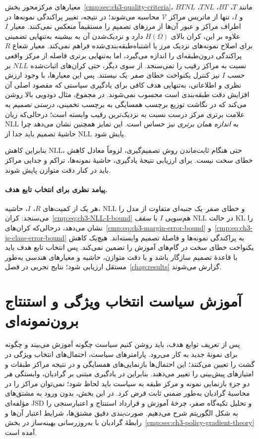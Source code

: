 معیارهای مرکز‌محور بخش~\ref{cmp:sec:ch3-quality-criteria}، مانند $T$، $BT$، $TNL$، $BTNL$ و $I$، تنها از ماتریس مراکز $\mathcal V$ محاسبه می‌شوند؛ در نتیجه، تغییر پراکندگی نمونه‌ها در اطراف مراکز و عبور آن‌ها از مرزهای تصمیم را مستقیماً منعکس نمی‌کنند. معیار $I$ علاوه بر این، کران بالای $H(\Omega)$ دارد و نزدیک‌شدن آن به بیشینه به‌تنهایی تضمینی برای اصلاح نمونه‌های نزدیک مرز یا اشتباه‌طبقه‌بندی‌شده فراهم نمی‌کند. معیار شعاع $R$ پراکندگی درون‌طبقه‌ای را اندازه می‌گیرد، اما به‌تنهایی برتری فاصله از مرکز واقعی نسبت به مراکز رقیب را نمی‌سنجد. از سوی دیگر، حتی کران‌های اثبات‌شده $NLL$ بر حسب $I$ نیز کنترل یکنواخت خطای صفر--یک نیستند. پس این معیارها، با وجود ارزش نظری و اطلاعاتی،
به‌تنهایی هدف کافی برای یادگیری سیاستی
که مقصود اصلی آن افزایش دقت طبقه‌بندی است
محسوب نمی‌شوند.
در مجموع، مثال دودویی بالا روشن می‌کند
که در نگاشت توزیع برچسب همسایگی
به برچسب تخمینی، \emph{درستی تصمیم}
به علامت برتری مرکز درست نسبت به
نزدیک‌ترین رقیب وابسته است؛
درحالی‌که زیان NLL به \emph{اندازه
همان برتری} نیز حساس است.
این تمایز همچنین نشان می‌دهد چرا
حاشیهٔ تصمیم باید جدا از NLL پایش شود.

بنابراین کاهش NLL، حتی هنگام ثابت‌ماندن
روش تصمیم‌گیری، لزوماً معادل کاهش خطای سخت
نیست. برای ارزیابی نتیجهٔ یادگیری،
حاشیهٔ نمونه‌ها، تراکم و جدایی مراکز
باید در کنار دقت متوازن پایش شوند.


\paragraph{پیامد نظری برای انتخاب تابع هدف.}
هر یک از کمیت‌های $R$، $I$، حاشیه، NLL و
خطای صفر--یک جنبه‌ای متفاوت از مدل را می‌سنجد:
کران~\eqref{cmp:eq:ch3-NLL-I-bound} هم‌سویی
$I$ با \emph{سقف} NLL در حالت KL را نشان می‌دهد،
درحالی‌که کران‌های~\eqref{cmp:eq:ch3-margin-error-bound}
و~\eqref{cmp:eq:ch3-js-class-error-bound}
به پراکندگی نمونه‌ها و فاصلهٔ تصمیم وابسته‌اند.
هیچ‌یک کاهش یکنواخت خطای سخت در گام‌های
آموزش را تضمین نمی‌کند. پس انتخاب تابع هدف باید
با قاعدهٔ تصمیم سازگار باشد و با دقت متوازن،
حاشیه و معیارهای هندسی به‌طور مستقل ارزیابی شود؛
نتایج تجربی در فصل~\ref{chap:results} گزارش می‌شوند.






\section{آموزش سیاست انتخاب ویژگی و استنتاج برون‌نمونه‌ای}
\label{cmp:sec:ch3-policy-learning-algorithm}
پس از تعریف توابع هدف، باید روشن کنیم
سیاست چگونه آموزش می‌بیند و چگونه
برای نمونهٔ جدید به کار می‌رود.
پارامترهای سیاست، احتمال‌های انتخاب
ویژگی در گشت را تعیین می‌کنند؛
این احتمال‌ها بازنمایی‌های همسایگی
و در نتیجه مراکز طبقات و امتیازهای
پیش‌بینی را تغییر می‌دهند. بنابراین
در یادگیری مبتنی بر گرادیان، وابستگی
\emph{هر دو} جزءِ بازنمایی نمونه
و مرکز طبقه به سیاست باید لحاظ شود؛
نمی‌توان مراکز را در محاسبهٔ گرادیان
به‌طور ضمنی ثابت فرض کرد.
در این بخش، بدون ورود به مشتق‌های
مؤلفه‌ای JSD و تحلیل تکیه‌گاه صفر،
چرخهٔ آموزش و قرارداد استنتاج
و اعتبارسنجی را به شکل الگوریتم
شرح می‌دهیم. صورت‌بندی دقیق مشتق‌ها،
شرایط اعتبار آن‌ها و رابطهٔ گرادیان
با به‌روزرسانی بهینه‌ساز در
بخش~\ref{cmp:sec:ch3-policy-gradient-theory}
آمده است.

